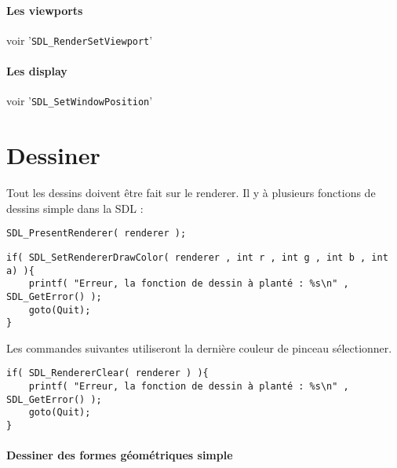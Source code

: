 \documentclass[ 10pt , a4paper ]{Document}
\begin{document}
\begin{Document}
		\paragraph{Les viewports}
			voir '\lstinline!SDL_RenderSetViewport!'
		\paragraph{Les display}
			voir '\lstinline!SDL_SetWindowPosition!'
\section{Dessiner}
	Tout les dessins doivent être fait sur le renderer.
	Il y à plusieurs fonctions de dessins simple dans la SDL :
\begin{lstlisting}[name="Afficher un dessin"]
SDL_PresentRenderer( renderer );
\end{lstlisting}
\begin{lstlisting}[name="Changer la couleur du pinceau"]
if( SDL_SetRendererDrawColor( renderer , int r , int g , int b , int a) ){
	printf( "Erreur, la fonction de dessin à planté : %s\n" , SDL_GetError() );
	goto(Quit);
}
\end{lstlisting}
	Les commandes suivantes utiliseront la dernière couleur de pinceau sélectionner.
\begin{lstlisting}[name="Changer le fond d'écran"]
if( SDL_RendererClear( renderer ) ){
	printf( "Erreur, la fonction de dessin à planté : %s\n" , SDL_GetError() );
	goto(Quit);
}
\end{lstlisting}
	\paragraph{Dessiner des formes géométriques simple}
\end{Document}
\end{document}
